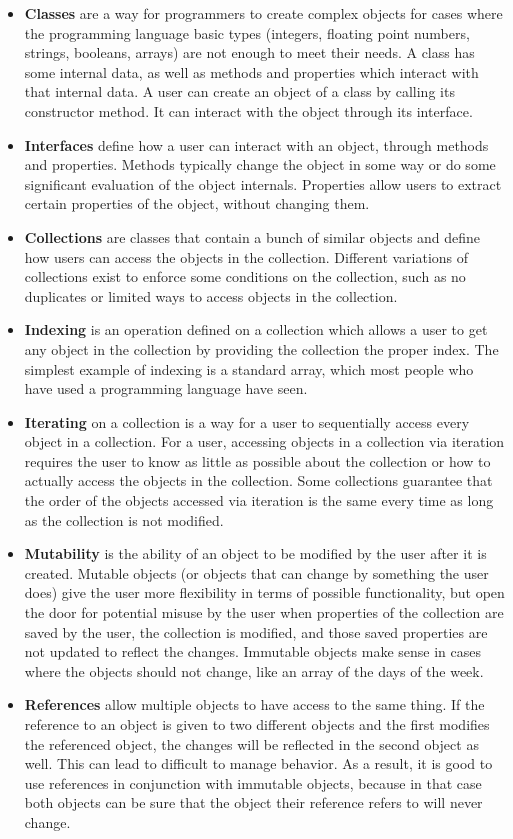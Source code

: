 \begin{itemize}
    \item \textbf{Classes} are a way for programmers to create complex objects for cases where the programming language basic types (integers, floating point numbers, strings, booleans, arrays) are not enough to meet their needs. A class has some internal data, as well as methods and properties which interact with that internal data. A user can create an object of a class by calling its constructor method. It can interact with the object through its interface.
    \item \textbf{Interfaces} define how a user can interact with an object, through methods and properties. Methods typically change the object in some way or do some significant evaluation of the object internals. Properties allow users to extract certain properties of the object, without changing them.
    \item \textbf{Collections} are classes that contain a bunch of similar objects and define how users can access the objects in the collection. Different variations of collections exist to enforce some conditions on the collection, such as no duplicates or limited ways to access objects in the collection.
    \item \textbf{Indexing} is an operation defined on a collection which allows a user to get any object in the collection by providing the collection the proper index. The simplest example of indexing is a standard array, which most people who have used a programming language have seen.
    \item \textbf{Iterating} on a collection is a way for a user to sequentially access every object in a collection. For a user, accessing objects in a collection via iteration requires the user to know as little as possible about the collection or how to actually access the objects in the collection. Some collections guarantee that the order of the objects accessed via iteration is the same every time as long as the collection is not modified. 
    \item \textbf{Mutability} is the ability of an object to be modified by the user after it is created. Mutable objects (or objects that can change by something the user does) give the user more flexibility in terms of possible functionality, but open the door for potential misuse by the user when properties of the collection are saved by the user, the collection is modified, and those saved properties are not updated to reflect the changes. Immutable objects make sense in cases where the objects should not change, like an array of the days of the week.
    \item \textbf{References} allow multiple objects to have access to the same thing. If the reference to an object is given to two different objects and the first modifies the referenced object, the changes will be reflected in the second object as well. This can lead to difficult to manage behavior. As a result, it is good to use references in conjunction with immutable objects, because in that case both objects can be sure that the object their reference refers to will never change.
\end{itemize}


